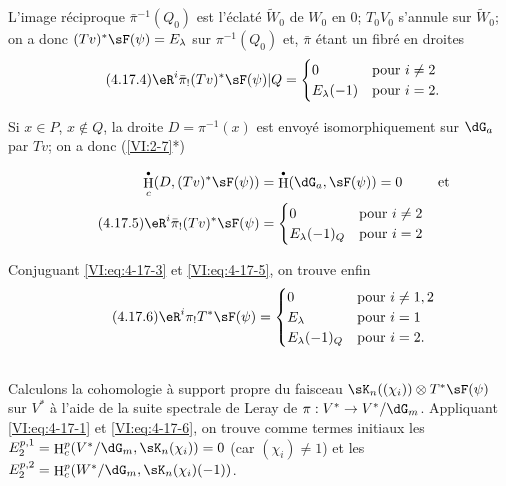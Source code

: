 \documentclass[oneside]{book}
\DeclareMathOperator{\h}{H}
\theoremstyle{sga-source}
\theoremstyle{sga-source-dash}
\theoremstyle{sga-source-dotdash}
\theoremstyle{sga-source-number-note-dash}
\theoremstyle{sga-source-note-number-dotdash}
\theoremstyle{sga-source-example-dotdash}
\theoremstyle{sga-source-inline-number}
\theoremstyle{sga-source-bare-number}
\theoremstyle{sga-source}
\let\oldbullet\bullet
\renewcommand{\bullet}{\textnormal{\tiny$\oldbullet$}}
\newcommand{\PrintPage}[1]{}\newcommand{\MathPage}[1]{}\newcommand{\PrintCite}[2]{#1}\newcommand{\var}[3]{#1}
\begin{document}
L'image réciproque $\bar\pi^{-1}(Q_0)$ est l'éclaté $\widetilde W_0$ de 
$W_0$ en $0$; \var{$T_0 V_0$ s'annule}{$T_0 v_0$ s'annule}{S45-SOL-0849} sur $\widetilde W_0$; on a donc 
$(T v)^\ast \sF(\psi)=E_\lambda$ \var{sur $\pi^{-1}(Q_0)$}{sur $\bar\pi^{-1}(Q_0)$}{S45-SOL-0850} et, $\bar\pi$ étant un 
fibré en droites 
\begin{equation*}\tag{4.17.4}\label{VI:eq:4-17-4}
  \eR^i \bar\pi_! (T v)^\ast \sF(\psi)|Q = 
    \begin{cases}
      0 & \text{pour $i\ne 2$} \\
      E_\lambda(-1) & \text{pour $i=2$.} 
    \end{cases} 
\end{equation*}

Si $x\in P$, $x\notin Q$, la droite \var{$D=\pi^{-1}(x)$}{$D=\bar\pi^{-1}(x)$}{S45-SOL-0851} \var{est envoyé}{est envoyée}{S45-SOL-0852} 
isomorphiquement sur $\dG_a$ par $T v$; on a donc 
(\ref{VI:2-7}*) 
\PrintPage{206}
\begin{align} \notag 
  \h_c^\bullet(D,(T v)^\ast \sF(\psi)) &= \h^\bullet(\dG_a,\sF(\psi)) = 0 && \text{et} \\
  \tag{4.17.5}\label{VI:eq:4-17-5}
  \eR^i \bar\pi_! (T v)^\ast \sF(\psi) 
    &= \begin{cases} 
         0 & \text{pour $i\ne 2$} \\
         E_\lambda(-1)_Q & \text{pour $i=2$} 
       \end{cases} 
\end{align}

Conjuguant \eqref{VI:eq:4-17-3} et \eqref{VI:eq:4-17-5}, on trouve enfin 
\begin{equation*}\tag{4.17.6}\label{VI:eq:4-17-6}
  \eR^i \pi_! T^\ast\sF(\psi) = 
    \begin{cases}
      0 & \text{pour $i\ne 1,2$} \\
      E_\lambda & \text{pour $i=1$} \\
      E_\lambda(-1)_Q & \text{pour $i=2$.} 
    \end{cases}
\end{equation*}





\subsection{}\label{VI:4-18}

Calculons la cohomologie à support propre du faisceau 
$\sK_n((\chi_i))\otimes T^\ast \sF(\psi)$ sur $V^\ast$ à l'aide de la suite 
spectrale de Leray de $\pi:V^\ast\to V^\ast/\dG_m$. Appliquant 
\eqref{VI:eq:4-17-1} et \eqref{VI:eq:4-17-6}, on trouve comme termes initiaux 
les $E_2^{p,1} = \h_c^p(V^\ast/\dG_m,\sK_n(\chi_i)) = 0$ (car $(\chi_i)\ne 1$) 
et les $E_2^{p,2} = \h_c^p(W^\ast/\dG_m,\sK_n(\chi_i)(-1))$. 
\end{document}

